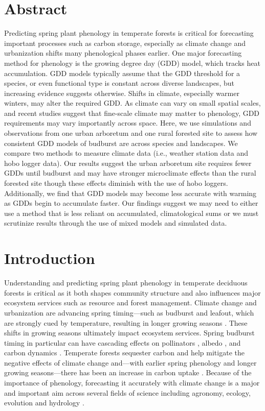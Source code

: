 \documentclass{article}\usepackage[]{graphicx}\usepackage[]{color}
\begin{document}
\section*{Abstract} 
Predicting spring plant phenology in temperate forests is critical for forecasting important processes such as carbon storage, especially as climate change and urbanization shifts many phenological phases earlier. One major forecasting method for phenology is the growing degree day (GDD) model, which tracks heat accumulation. GDD models typically assume that the GDD threshold for a species, or even functional type is constant across diverse landscapes, but increasing evidence suggests otherwise. Shifts in climate, especially warmer winters, may alter the required GDD. As climate can vary on small spatial scales, and recent studies suggest that fine-scale climate may matter to phenology, GDD requirements may vary importantly across space. Here, we use simulations and observations from one urban arboretum and one rural forested site to assess how consistent GDD models of budburst are across species and landscapes. We compare two methods to measure climate data (i.e., weather station data and hobo logger data). Our results suggest the urban arboretum site requires fewer GDDs until budburst and may have stronger microclimate effects than the rural forested site though these effects diminish with the use of hobo loggers. Additionally, we find that GDD models may become less accurate with warming as GDDs begin to accumulate faster. Our findings suggest we may need to either use a method that is less reliant on accumulated, climatological sums or we must scrutinize results through the use of mixed models and simulated data.

\section*{Introduction}

Understanding and predicting spring plant phenology in temperate deciduous forests is critical as it both shapes community structure and also influences major ecosystem services such as resource and forest management. Climate change and urbanization are advancing spring timing---such as budburst and leafout, which are strongly cued by temperature, resulting in longer growing seasons \citep{Chuine2001}. These shifts in growing seasons ultimately impact ecosystem services. Spring budburst timing in particular can have cascading effects on pollinators \citep{Boggs2012, Pardee2017}, albedo \citep{Williamson2016}, and carbon dynamics \citep{Richardson2013}. Temperate forests sequester carbon and help mitigate the negative effects of climate change and---with earlier spring phenology and longer growing seasons---there has been an increase in carbon uptake \citep{Keenan2014}. Because of the importance of phenology, forecasting it accurately with climate change is a major and important aim across several fields of science including agronomy, ecology, evolution and hydrology \citep{Bolton2013,Moorcroft2001,Taylor2020,Yu2016}. 
  
\end{document}
